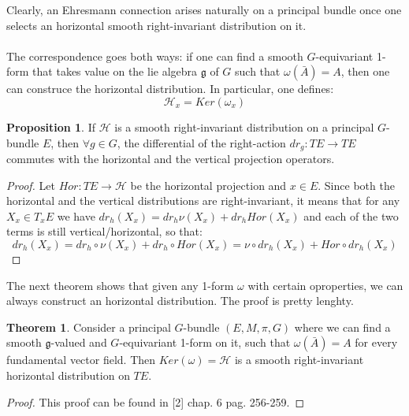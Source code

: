 \documentclass[12pt,a4paper]{report}
\theoremstyle{definition}
\theoremstyle{Theorem}
\newtheorem{Theo}[Def]{Theorem}
\newtheorem{Prop}[Def]{Proposition}
\theoremstyle{definition}
\theoremstyle{definition}
\begin{document}
	Clearly, an Ehresmann connection arises naturally on a principal bundle once one selects an horizontal smooth right-invariant distribution on it.\\
	\\
	The correspondence goes both ways: if one can find a smooth $G$-equivariant 1-form that takes value on the lie algebra $\mathfrak{g}$ of $G$ such that $\omega(\bar{A})=A$, then one can construce the horizontal distribution. In particular, one defines: $$\mathcal{H}_{x}=Ker(\omega_{x})$$
	\begin{Prop}\label{Prop_5.3.1}
		If $\mathcal{H}$ is a smooth right-invariant distribution on a principal $G$-bundle $E$, then $\forall g\in G$, the differential of the right-action $dr_g:TE\rightarrow TE$ commutes with the horizontal and the vertical projection operators.
	\end{Prop}
	\begin{proof}
		Let $Hor:TE\rightarrow\mathcal{H}$ be the horizontal projection and $x\in E$. Since both the horizontal and the vertical distributions are right-invariant, it means that for any $X_{x}\in T_xE$ we have $dr_h( X_{x})=dr_h \nu(X_{x})+dr_hHor(X_{x})$ and each of the two terms is still vertical/horizontal, so that:
		$$dr_h (X_{x})=dr_h\circ \nu(X_{x})+dr_h\circ Hor(X_{x})=
		\nu\circ dr_h(X_{x})+Hor\circ dr_h(X_{x})$$
	\end{proof}
	The next theorem shows that given any 1-form $\omega$ with certain oproperties, we can always construct an horizontal distribution. The proof is pretty lenghty.
	\begin{Theo}
		Consider a principal $G$-bundle $(E,M,\pi,G)$ where we can find a smooth $\mathfrak{g}$-valued and $G$-equivariant 1-form on it, such that $\omega(\bar{A})=A$ for every fundamental vector field. Then $Ker(\omega)=\mathcal{H}$ is a smooth right-invariant horizontal distribution on $TE$.
	\end{Theo}
	\begin{proof}
		This proof can be found in [2] chap. 6 pag. 256-259.
	\end{proof}
\end{document}
